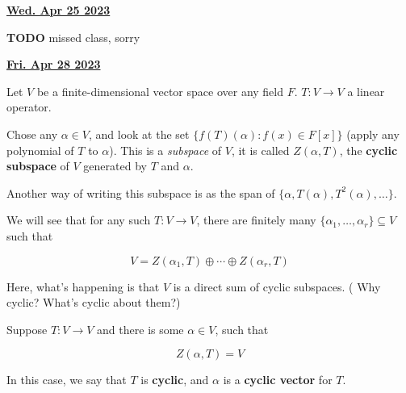 \documentclass[12pt]{article}
\renewcommand{\date}[1]{\underline{\bf #1}}
\newcommand{\TODO}{\color{red}\textbf{TODO}\color{black}}
\begin{document}
  \date{Wed. Apr 25 2023}

  \TODO{} missed class, sorry

  \date{Fri. Apr 28 2023}

  Let $V$ be a finite-dimensional vector space over any field $F$. $T: V \to V$
  a linear operator.

  Chose any $\alpha \in V$, and look at the set $\{f(T)(\alpha) : f(x) \in
  F[x]\}$ (apply any polynomial of $T$ to $\alpha$). This is a {\it subspace} of
  $V$, it is called $Z(\alpha, T)$, the {\bf cyclic subspace} of $V$ generated
  by $T$ and $\alpha$.

  Another way of writing this subspace is as the span of $\{\alpha, T(\alpha),
  T^2(\alpha), \dots\}$.

  We will see that for any such $T: V \to V$, there are finitely many
  $\{\alpha_1, \dots, \alpha_r\} \subseteq V$ such that

  \[
    V = Z(\alpha_1, T) \oplus \cdots \oplus Z(\alpha_r, T)
  \]

  Here, what's happening is that $V$ is a direct sum of cyclic subspaces.
  (\QUESTION{} Why cyclic? What's cyclic about them?)

  Suppose $T: V \to V$ and there is some $\alpha \in V$, such that

  \[
    Z(\alpha, T) = V
  \]

  In this case, we say that $T$ is {\bf cyclic}, and $\alpha$ is a {\bf cyclic
  vector} for $T$.



\end{document}

